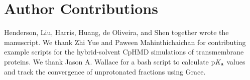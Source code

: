 \documentclass[9pt,tutorial]{livecoms}
\newcommand{\pka}{p\textit{K}$_{\rm a}$}
\newcommand{\githubrepository}{\url{
https://github.com/JanaShenLab/CpHMD-Tutorial}}  %
\begin{document}















\section{Author Contributions}
%
Henderson, Liu, Harris, Huang, de Oliveira, and Shen
together wrote the manuscript.
We thank Zhi Yue and Paween Mahinthichaichan for contributing example scripts for the hybrid-solvent CpHMD simulations of transmembrane proteins.
We thank Jason A. Wallace for a bash script to calculate {\pka} values and track the convergence of unprotonated fractions using Grace.

%

\end{document}
